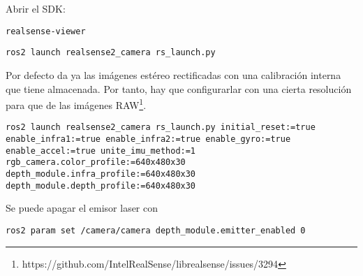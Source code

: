 \documentclass[apunte]{lcc}
\begin{document}
Abrir el SDK:
\begin{lstlisting}[style=bash]
realsense-viewer
\end{lstlisting}

\begin{lstlisting}[style=bash]
ros2 launch realsense2_camera rs_launch.py
\end{lstlisting}

Por defecto da ya las imágenes estéreo rectificadas con una calibración interna que tiene almacenada. Por tanto, hay que configurarlar con una cierta resolución para que de las imágenes RAW\footnote{https://github.com/IntelRealSense/librealsense/issues/3294}.

\begin{lstlisting}[style=bash]
ros2 launch realsense2_camera rs_launch.py initial_reset:=true enable_infra1:=true enable_infra2:=true enable_gyro:=true enable_accel:=true unite_imu_method:=1 rgb_camera.color_profile:=640x480x30 depth_module.infra_profile:=640x480x30 depth_module.depth_profile:=640x480x30
\end{lstlisting}

Se puede apagar el emisor laser con

\begin{lstlisting}[style=bash]
ros2 param set /camera/camera depth_module.emitter_enabled 0
\end{lstlisting}
\end{document}
